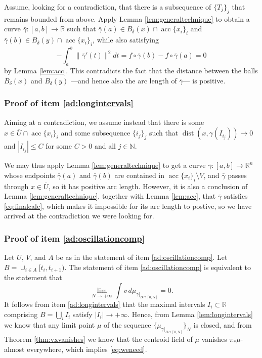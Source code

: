 \documentclass[11pt]{article}
\theoremstyle{definition}
\theoremstyle{remark}
\DeclareMathOperator{\dist}{dist}
\DeclareMathOperator{\acc}{acc}
\newcommand{\R}{\mathbb{R}}
\newcommand{\N}{\mathbb{N}}
\renewcommand{\leq}{\leqslant}
\newcommand{\meas}[2]{\mu_{#1|_{#2}}}
\begin{document}
Assume, looking for a contradiction, that there is a subsequence of $\{T_j\}_j$ that remains bounded from above. Apply Lemma \ref{lem:generaltechnique} to obtain a curve $\bar\gamma\colon[a,b]\to\R$ such that $\bar\gamma(a)\in B_{\delta}(x)\cap\acc\{x_i\}_i$ and $\bar\gamma(b)\in B_\delta(y)\cap\acc\{x_i\}_i$, while also satisfying
 \begin{equation}\label{eq:finalcalc}
 -\int_a^b \|\bar\gamma'(t)\|^2dt =f\circ\bar\gamma(b)-f\circ\bar\gamma(a)=0
\end{equation}
by Lemma \ref{lem:acc}. This contradicts the fact that the distance between the balls $B_\delta(x)$ and $B_\delta(y)$ ---and hence also the arc length of $\bar\gamma$--- is positive.

\subsubsection{Proof of item \ref{ad:longintervals}}
\label{sec:pfaddendum4}


 Aiming at a contradiction, we assume instead that there is some $x\in \overline U\cap\operatorname{acc}\{x_i\}_i$ and some subsequence $\{i_j\}_j$ such that $\dist(x,\gamma(I_{i_j}))\to 0$ and $|I_{i_j}|\leq C$ for some $C>0$ and all $j\in\N$. 

 
 We may thus apply Lemma \ref{lem:generaltechnique} to get a curve $\bar\gamma:[a,b]\to\R^n$ whose endpoints $\bar\gamma(a)$ and $\bar\gamma(b)$ are contained in $\acc\{x_i\}_i\setminus V$, and $\bar\gamma$ passes through $x\in \overline U$, so it has positive arc length. However, it is also a conclusion of Lemma \ref{lem:generaltechnique}, together with Lemma \ref{lem:acc}, that $\bar\gamma$ satisfies \eqref{eq:finalcalc}, which makes it impossible for its arc length to postive, so we have arrived at the contradiction we were looking for.



\subsubsection{Proof of item \ref{ad:oscillationcomp}}
\label{sec:pfaddendum1}

Let $U$, $V$, and $A$ be as in the statement of item \ref{ad:oscillationcomp}. 
Let $B=\cup_{i\in A}[t_i,t_{i+1})$. 
The statement of item \ref{ad:oscillationcomp} is equivalent to the statement that 
\begin{equation}\label{eq:weneed}\lim_{N\to+\infty}\int v\,d\meas{\gamma}{B\cap[0,N]}=0.\end{equation}
It follows from item \ref{ad:longintervals} that the maximal intervals $I_i\subset \R$ comprising $B=\bigcup_iI_i$ satisfy $|I_i|\to +\infty$. Hence, from Lemma \ref{lem:longintervals} we know that any limit point $\mu$ of the sequence $\{\meas{\gamma}{B\cap[0,N]}\}_N$ is closed, and from Theorem \ref{thm:vxvanishes} we know that the centroid field of $\mu$ vanishes $\pi_*\mu$-almost everywhere, which implies \eqref{eq:weneed}.
\end{document}
